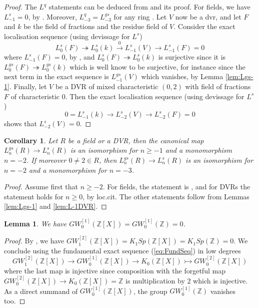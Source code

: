 \documentclass[10pt,twoside,a4paper,reqno]{amsart}
\newtheorem{lemma}[theorem]{Lemma}
\newtheorem{corollary}[theorem]{Corollary}
\theoremstyle{definition}
\numberwithin{equation}{section}
\newcommand{\Z}{\mathbb{Z}}
\renewcommand{\|}{\operatorname{|}}
\begin{document}
\begin{proof}
The $L^q$ statements can be deduced from \cite[Proposition 2.3.9]{CDH+III} and its proof.
For fields, we have $L^s_{-1}=0$, by \cite[Corollary 1.3.8]{CDH+III}.
Moreover, $L^q_{-3}=L^{gs}_{-3}$ for any ring \cite[Corollary 1.2.12]{CDH+III}.
Let $V$ now be a dvr, and let $F$ and $k$ be the field of fractions and the residue field of $V$.
Consider the exact localisation sequence (using devissage for $L^s$)
$$L^s_0(F) \twoheadrightarrow L^s_0(k) \stackrel{0}{\longrightarrow} L_{-1}^s(V) \to L_{-1}^s(F)=0$$
where $L^s_{-1}(F)=0$, by \cite[Corollary 1.3.8]{CDH+III}, and $L^s_0(F) \twoheadrightarrow L^s_0(k)$ is surjective since it is $L^{gs}_0(F) \twoheadrightarrow L^{gs}_0(k)$ which is well know to be surjective, for instance since the next term in the exact sequence is $L^{gs}_{-1}(V)$ which vanishes, by Lemma \ref{lem:Lgs-1}.
Finally, let $V$ be a DVR of mixed characteristic $(0,2)$ with field of fractions $F$ of characteristic $0$.
Then  the exact localisation sequence (using devissage for $L^s$)
$$0= L^s_{-1}(k) \to L_{-2}^s(V) \to L_{-2}^s(F)=0$$
shows that $L_{-2}^s(V)=0$.
\end{proof}

\begin{corollary}
\label{cor:LvsLDVR}
Let $R$ be a field or a DVR, then the canonical map $L^{gs}_n(R) \to L^{s}_n(R)$ is an isomorphism for $n\geq -1$ and a monomorphism $n=-2$.
If moreover $0\neq 2\in R$, then $L^{gs}_n(R) \to L^{s}_n(R)$ is an isomorphism for $n=-2$ and a monomorphism for $n=-3$.
\end{corollary}

\begin{proof}
Assume first that $n\geq -2$.
For fields, the statement is \cite[Theorem 6, Corollary 1.3.10]{CDH+III}, and for DVRs the statement holds for $n\geq 0$, by loc.cit.
The other statements follow from Lemmas \ref{lem:Lgs-1} and \ref{lem:L-1DVR}.
\end{proof}

\begin{lemma}
\label{lem:GW10ZX}
We have $GW^{[1]}_0(\Z[X])=GW^{[1]}_0(\Z)=0$.
\end{lemma}

\begin{proof}
By \cite[Corollary 1.4]{Grunewald+MathZ}, we have $GW^{[2]}_1(\Z[X]) = K_1Sp(\Z[X]) = K_1Sp(\Z)=0$.
We conclude using the fundamental exact sequence (\ref{eq:FundSeq}) in low degrees
$$GW^{[2]}_1(\Z[X]) \to GW^{[1]}_0(\Z[X]) \to K_0(\Z[X]) \rightarrowtail GW^{[2]}_0(\Z[X])$$
where the last map is injective since composition with the forgetful map $GW^{[2]}_0(\Z[X]) \to K_0(\Z[X])=\Z$ is multiplication by $2$ which is injective. 
As a direct summand of $GW^{[1]}_0(\Z[X])$, the group $GW^{[1]}_0(\Z)$ vanishes too.
\end{proof}
\end{document}
